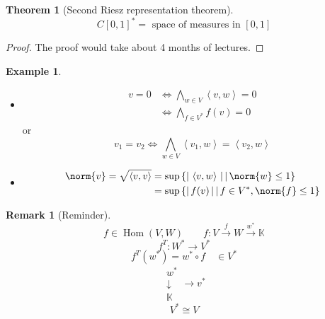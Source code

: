 \documentclass[a4paper,landscape,twocolumn]{article}
\newcommand\abs[1]{|\,#1\,|}
\newcommand\setdef[2]{\left\{#1\,\middle|\,#2\right\}}
\newcommand\functional[1]{\left\langle{#1}\right\rangle}
\theoremstyle{definition}
\newtheorem{theorem}{Theorem}
\newtheorem{ex}{Example}
\newtheorem{rem}{Remark}
\DeclareMathOperator\Hom{Hom} %
\DeclarePairedDelimiter\norm\lVert\rVert
\begin{document}
\begin{theorem}[Second Riesz representation theorem]
  \[ C[0,1]^* = \text{ space of measures in } [0,1] \]
\end{theorem}
\begin{proof}
  The proof would take about 4 months of lectures.
\end{proof}

\begin{ex}
  \label{ex-8.62}
  \begin{itemize}
    \item
      \begin{align*}
        v = 0 &\Leftrightarrow \bigwedge_{w \in V} \functional{v,w} = 0 \\
              &\Leftrightarrow \bigwedge_{f \in V^*} f(v) = 0
      \end{align*}
      or
      \[ v_1 = v_2 \Leftrightarrow \bigwedge_{w \in V} \functional{v_1, w} = \functional{v_2, w} \]
    \item
      \begin{align*}
        \norm{v} = \sqrt{\functional{v,v}}
          &= \sup\setdef{\abs{\functional{v,w}}}{\norm{w} \leq 1} \\
          &= \sup\setdef{\abs{f(v)}}{f \in V^*, \norm{f} \leq 1}
      \end{align*}
  \end{itemize}
\end{ex}

\begin{rem}[Reminder]
  \[ f \in \Hom(V,W) \qquad f: V \overset{f}{\to} W \overset{w^*}{\to} \mathbb K \]
  \[ f^T: W^* \to V^* \]
  \[ f^T(w^*) = w^* \circ f \quad \in V^* \]
  \[ \substack{w^* \\ \downarrow \\ \mathbb K} \to v^* \]
  \[ V^* \cong V \]
\end{rem}
\end{document}
